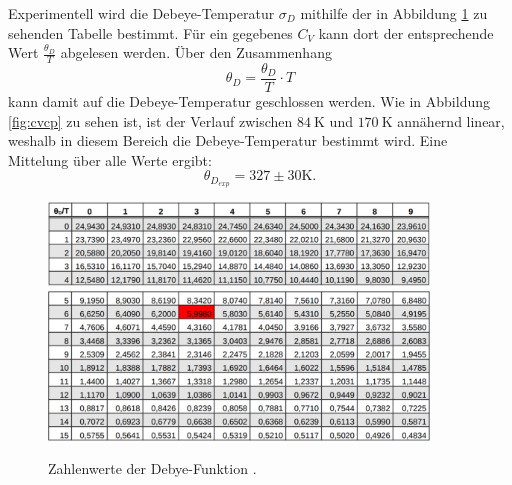Experimentell wird die Debeye-Temperatur $\sigma_D$ mithilfe der in Abbildung \ref{fig:deb} zu sehenden Tabelle bestimmt. Für ein gegebenes $C_V$ kann dort der entsprechende Wert $\frac{\theta_D}{T}$ abgelesen werden. Über den Zusammenhang
\begin{equation}
    \theta_D = \frac{\theta_D}{T} \cdot T
\end{equation}
kann damit auf die Debeye-Temperatur geschlossen werden.
Wie in Abbildung \ref{fig:cvcp} zu sehen ist, ist der Verlauf zwischen $\SI{84}{\kelvin}$ und $\SI{170}{\kelvin}$ annähernd linear, weshalb in diesem Bereich die Debeye-Temperatur bestimmt wird.
Eine Mittelung über alle Werte ergibt:
\begin{equation}
    \theta_{D_{exp}} = 327 \pm 30 \si{\kelvin}.
\end{equation}
\begin{figure}
    \centering
    \includegraphics[width=0.9\textwidth]{content/images/table1.png}
    \includegraphics[width=0.9\textwidth]{content/images/table2.png}
    \caption{Zahlenwerte der Debye-Funktion \cite{anleitung}.}
    \label{fig:deb}
\end{figure}
